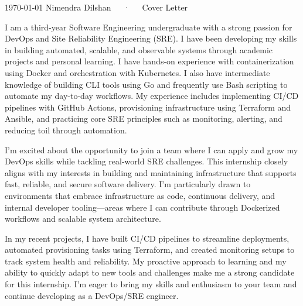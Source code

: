 \documentclass[11pt, a4paper]{awesome-cv}
\begin{document}
\makecvheader[L]
\makecvfooter
  {\today}
  {Nimendra Dilshan~~~·~~~Cover Letter}
  {}
\makelettertitle

\begin{cvletter}


I am a third-year Software Engineering undergraduate with a strong passion for DevOps and Site Reliability Engineering (SRE). I have been developing my skills in building automated, scalable, and observable systems through academic projects and personal learning. I have hands-on experience with containerization using Docker and orchestration with Kubernetes. I also have intermediate knowledge of building CLI tools using Go and frequently use Bash scripting to automate my day-to-day workflows. My experience includes implementing CI/CD pipelines with GitHub Actions, provisioning infrastructure using Terraform and Ansible, and practicing core SRE principles such as monitoring, alerting, and reducing toil through automation.


I’m excited about the opportunity to join a team where I can apply and grow my DevOps skills while tackling real-world SRE challenges. This internship closely aligns with my interests in building and maintaining infrastructure that supports fast, reliable, and secure software delivery. I’m particularly drawn to environments that embrace infrastructure as code, continuous delivery, and internal developer tooling—areas where I can contribute through Dockerized workflows and scalable system architecture.


In my recent projects, I have built CI/CD pipelines to streamline deployments, automated provisioning tasks using Terraform, and created monitoring setups to track system health and reliability. My proactive approach to learning and my ability to quickly adapt to new tools and challenges make me a strong candidate for this internship. I’m eager to bring my skills and enthusiasm to your team and continue developing as a DevOps/SRE engineer.

\end{cvletter}


\makeletterclosing
\end{document}
